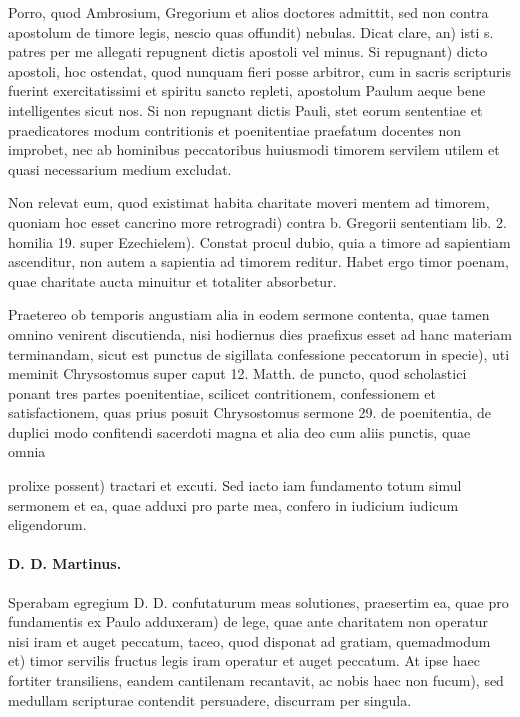 Porro, quod Ambrosium, Gregorium et alios doctores admittit, sed non contra apostolum de timore legis, nescio quas offundit) nebulas. Dicat clare, an) isti s. patres per me allegati repugnent dictis apostoli vel minus. Si repugnant) dicto apostoli, hoc ostendat, quod nunquam fieri posse arbitror, cum in sacris scripturis fuerint exercitatissimi et spiritu sancto repleti, apostolum Paulum aeque bene intelligentes sicut nos. Si non repugnant dictis Pauli, stet eorum sententiae et praedicatores modum contritionis et poenitentiae praefatum docentes non improbet, nec ab hominibus peccatoribus huiusmodi timorem servilem utilem et quasi necessarium medium excludat.

Non relevat eum, quod existimat habita charitate moveri mentem ad timorem, quoniam hoc esset cancrino more retrogradi) contra b. Gregorii sententiam lib. 2. homilia 19. super Ezechielem). Constat procul dubio, quia a timore ad sapientiam ascenditur, non autem a sapientia ad timorem reditur. Habet ergo timor poenam, quae charitate aucta minuitur et totaliter absorbetur.

\marginpar{\small[368]} Praetereo ob temporis angustiam alia in eodem sermone contenta, quae tamen omnino venirent discutienda, nisi hodiernus dies praefixus esset ad hanc materiam terminandam, sicut est punctus de sigillata confessione peccatorum in specie), uti meminit Chrysostomus super caput 12. Matth. de puncto, quod scholastici ponant tres partes poenitentiae, scilicet contritionem, confessionem et satisfactionem, quas prius posuit Chrysostomus sermone 29. de poenitentia, de duplici modo confitendi sacerdoti magna et alia deo cum aliis punctis, quae omnia

prolixe possent) tractari et excuti. Sed iacto iam fundamento totum simul sermonem et ea, quae adduxi pro parte mea, confero in iudicium iudicum eligendorum.

\paragraph*{D. D. Martinus.}

Sperabam egregium D. D. confutaturum meas solutiones, praesertim ea, quae pro fundamentis ex Paulo adduxeram) de lege, quae ante charitatem non operatur nisi iram et auget peccatum, taceo, quod disponat ad gratiam, quemadmodum et) timor servilis fructus legis iram operatur et auget peccatum. At ipse haec fortiter transiliens, eandem cantilenam recantavit, ac nobis haec non fucum), sed medullam scripturae contendit persuadere, discurram per singula.

